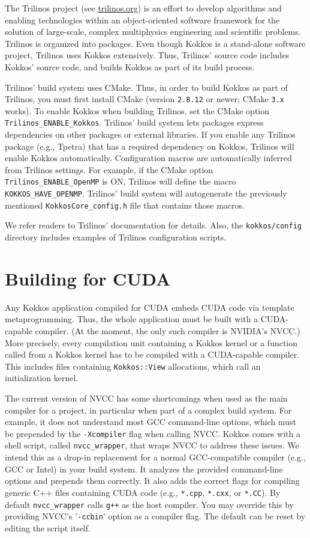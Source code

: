 The Trilinos project (see \url{trilinos.org}) is an effort to develop
algorithms and enabling technologies within an object-oriented
software framework for the solution of large-scale, complex
multiphysics engineering and scientific problems.  Trilinos is
organized into packages.  Even though Kokkos is a stand-alone software
project, Trilinos uses Kokkos extensively.  Thus, Trilinos' source
code includes Kokkos' source code, and builds Kokkos as part of its
build process.

Trilinos' build system uses CMake.  Thus, in order to build Kokkos as
part of Trilinos, you must first install CMake (version
\texttt{2.8.12} or newer; CMake \texttt{3.x} works).  
To enable Kokkos when building Trilinos, set the CMake option \verb!Trilinos_ENABLE_Kokkos!.
Trilinos' build system lets packages express dependencies on other packages or external libraries.
If you enable any Trilinos package (e.g., Tpetra) that has a required dependency on Kokkos, 
Trilinos will enable Kokkos automatically.
Configuration macros are automatically inferred from Trilinos settings. 
For example, if the CMake option \lstinline|Trilinos_ENABLE_OpenMP| is ON, Trilinos will define the macro \lstinline|KOKKOS_HAVE_OPENMP|.
Trilinos' build system will autogenerate the previously mentioned \lstinline|KokkosCore_config.h| file that contains those macros. 

We refer readers to Trilinos' documentation for details.  Also, the
\texttt{kokkos/config} directory includes examples of Trilinos
configuration scripts.
 
\section{Building for CUDA}\label{S:build:CUDA}

Any Kokkos application compiled for CUDA embeds CUDA code via template metaprogramming.
Thus, the whole application must be built with a CUDA-capable compiler.
(At the moment, the only such compiler is NVIDIA's NVCC.)
More precisely, every compilation unit containing a Kokkos kernel or a function called from a Kokkos kernel has to be compiled with a CUDA-capable compiler. 
This includes files containing \lstinline|Kokkos::View| allocations, which call an initialization kernel. 

The current version of NVCC has some shortcomings when used as the main compiler for a project, in particular when part of a complex build system.
For example, it does not understand most GCC command-line options, which must be prepended by the \lstinline|-Xcompiler| flag when calling NVCC. 
Kokkos comes with a shell script, called \lstinline|nvcc_wrapper|, that wraps NVCC to address these issues.
We intend this as a drop-in replacement for a normal GCC-compatible compiler (e.g., GCC or Intel) in your build system.
It analyzes the provided command-line options and prepends them correctly. 
It also adds the correct flags for compiling generic C++ files containing CUDA code (e.g., \verb!*.cpp!, \verb!*.cxx!, or \verb!*.CC!).
By default \lstinline|nvcc_wrapper| calls \verb!g++! as the host compiler.
You may override this by providing NVCC's '\lstinline|-ccbin|' option as a compiler flag.
The default can be reset by editing the script itself. 

